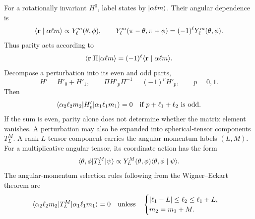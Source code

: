 For a rotationally invariant $H^0$, label states by $\lvert \alpha\ell m\rangle$.
Their angular dependence is
\[
 \langle \mathbf r\mid \alpha\ell m\rangle\propto Y_\ell^m(\theta,\phi),
 \qquad Y_\ell^m(\pi-\theta,\pi+\phi)=(-1)^\ell Y_\ell^m(\theta,\phi).
\]
Thus parity acts according to
\[
 \langle \mathbf r\rvert \Pi\lvert \alpha\ell m\rangle
   =(-1)^\ell\langle \mathbf r\mid \alpha\ell m\rangle.
\]
Decompose a perturbation into its even and odd parts,
\[
 H'=H'_0+H'_1,\qquad
 \Pi H'_p\Pi^{-1}=(-1)^pH'_p,\qquad p=0,1.
\]
Then
\[
 \langle \alpha_2\ell_2m_2\rvert H'_p\lvert \alpha_1\ell_1m_1\rangle=0
 \quad\text{if }p+\ell_1+\ell_2\text{ is odd}.
\]
If the sum is even, parity alone does not determine whether the matrix
element vanishes.
A perturbation may also be expanded into spherical-tensor components
$T_L^M$. A rank-$L$ tensor component carries the angular-momentum labels
$(L,M)$. For a multiplicative angular tensor, its coordinate action has
the form
\[
 \langle \theta,\phi\rvert T_L^M\lvert \psi\rangle
 \propto Y_L^M(\theta,\phi)\langle \theta,\phi\mid \psi\rangle.
\]
The angular-momentum selection rules following from the Wigner--Eckart
theorem are
\[
 \langle \alpha_2\ell_2m_2\rvert T_L^M\lvert \alpha_1\ell_1m_1\rangle=0
 \quad\text{unless}\quad
 \begin{cases}
 |\ell_1-L|\le\ell_2\le\ell_1+L,\\
 m_2=m_1+M.
 \end{cases}
\]
